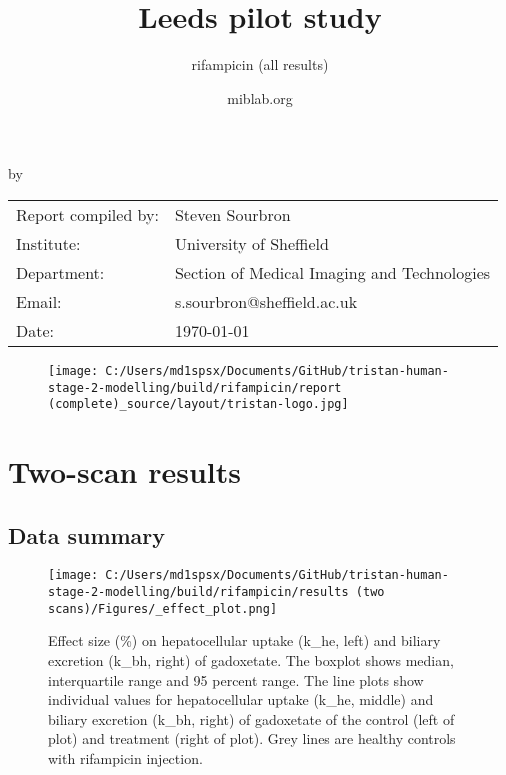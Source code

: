 \documentclass{epflreport}%
\begin{document}
%
\normalsize%
\frontmatter%
\title{Leeds pilot study}%
\subtitle{rifampicin (all results)}%
\author{miblab.org}%
\subject{D2.13 {-} Internal report}%
%
%
%
\makecover%
\begin{titlepage}%
\begin{center}%
\makeatletter%
\largetitlestyle\fontsize{45}{45}\selectfont\@title%
\makeatother%
\linebreak%
\makeatletter%
\ifdefvoid{\@subtitle}{}{\bigskip\titlestyle\fontsize{20}{20}\selectfont\@subtitle}%
\makeatother%
\linebreak%
\bigskip%
\bigskip%
by%
\linebreak%
\bigskip%
\bigskip%
\makeatletter%
\largetitlestyle\fontsize{25}{25}\selectfont\@author%
\makeatother%
\vfill%
\large%
\begin{tabular}{ll}%
\hline%
Report compiled by: &Steven Sourbron\\%
Institute: &University of Sheffield\\%
Department: &Section of Medical Imaging and Technologies\\%
Email: &s.sourbron@sheffield.ac.uk\\%
Date: &\today\\%
\hline%
\end{tabular}%


\begin{figure}[b!]%
\centering%
\centering%
\texttt{[image: C:/Users/md1spsx/Documents/GitHub/tristan-human-stage-2-modelling/build/rifampicin/report (complete)\_source/layout/tristan-logo.jpg]}%
\end{figure}

%
\end{center}%
\end{titlepage}%
\newpage%
\tableofcontents%
\mainmatter%
\clearpage%
\chapter{Two{-}scan results}%
\section{Data summary}%
\label{sec:Datasummary}%

%


\begin{figure}[h!]%
\centering%
\texttt{[image: C:/Users/md1spsx/Documents/GitHub/tristan-human-stage-2-modelling/build/rifampicin/results (two scans)/Figures/\_effect\_plot.png]}%
\caption{Effect size (\%) on hepatocellular uptake (k\_he, left) and biliary excretion (k\_bh, right) of gadoxetate. The boxplot shows median, interquartile range and 95 percent range. The line plots show individual values for hepatocellular uptake (k\_he, middle) and biliary excretion (k\_bh, right) of gadoxetate of the control (left of plot) and treatment (right of plot). Grey lines are healthy controls with rifampicin injection.}%
\end{figure}
\end{document}
